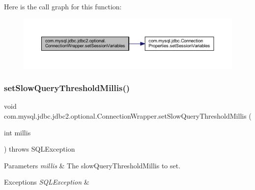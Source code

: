 Here is the call graph for this function\+:
\nopagebreak
\begin{figure}[H]
\begin{center}
\leavevmode
\includegraphics[width=350pt]{classcom_1_1mysql_1_1jdbc_1_1jdbc2_1_1optional_1_1_connection_wrapper_a7c272bd82ff6771c2ab657ee759dfa00_cgraph}
\end{center}
\end{figure}
\mbox{\label{classcom_1_1mysql_1_1jdbc_1_1jdbc2_1_1optional_1_1_connection_wrapper_ac0a113a1ba7f79345af3609e978a93fe}} 
\subsubsection{\texorpdfstring{set\+Slow\+Query\+Threshold\+Millis()}{setSlowQueryThresholdMillis()}}
{\footnotesize\ttfamily void com.\+mysql.\+jdbc.\+jdbc2.\+optional.\+Connection\+Wrapper.\+set\+Slow\+Query\+Threshold\+Millis (\begin{DoxyParamCaption}\item[{int}]{millis }\end{DoxyParamCaption}) throws S\+Q\+L\+Exception}


\begin{DoxyParams}{Parameters}
{\em millis} & The slow\+Query\+Threshold\+Millis to set. \\
\hline
\end{DoxyParams}

\begin{DoxyExceptions}{Exceptions}
{\em S\+Q\+L\+Exception} & \\
\hline
\end{DoxyExceptions}


